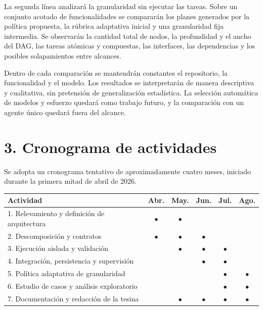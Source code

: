 \documentclass[11pt,a4paper]{article}
\begin{document}
La segunda l\'inea analizar\'a la granularidad sin ejecutar las tareas. Sobre un
conjunto acotado de funcionalidades se comparar\'an los planes generados por la
pol\'itica propuesta, la r\'ubrica adaptativa inicial y una granularidad fija
intermedia. Se observar\'an la cantidad total de nodos, la profundidad y el ancho
del DAG, las tareas at\'omicas y compuestas, las interfaces, las dependencias y
los posibles solapamientos entre alcances.

Dentro de cada comparaci\'on se mantendr\'an constantes el repositorio, la
funcionalidad y el modelo. Los resultados se interpretar\'an de manera
descriptiva y cualitativa, sin pretensi\'on de generalizaci\'on estad\'istica. La
selecci\'on autom\'atica de modelos y esfuerzo quedar\'a como trabajo futuro, y la
comparaci\'on con un agente \'unico quedar\'a fuera del alcance.

\section*{3. Cronograma de actividades}

Se adopta un cronograma tentativo de aproximadamente cuatro meses, iniciado
durante la primera mitad de abril de 2026.

\begin{center}
\small
\begin{tabularx}{\textwidth}{@{}Xccccc@{}}
  \toprule
  \textbf{Actividad} & \textbf{Abr.} & \textbf{May.} & \textbf{Jun.} & \textbf{Jul.} & \textbf{Ago.} \\
  \midrule
  1. Relevamiento y definici\'on de arquitectura
    & \(\bullet\) & \(\bullet\) & & & \\
  2. Descomposici\'on y contratos
    & \(\bullet\) & \(\bullet\) & \(\bullet\) & & \\
  3. Ejecuci\'on aislada y validaci\'on
    & & \(\bullet\) & \(\bullet\) & \(\bullet\) & \\
  4. Integraci\'on, persistencia y supervisi\'on
    & & & \(\bullet\) & \(\bullet\) & \\
  5. Pol\'itica adaptativa de granularidad
    & & & & \(\bullet\) & \(\bullet\) \\
  6. Estudio de casos y an\'alisis exploratorio
    & & & & \(\bullet\) & \(\bullet\) \\
  7. Documentaci\'on y redacci\'on de la tesina
    & & \(\bullet\) & \(\bullet\) & \(\bullet\) & \(\bullet\) \\
  \bottomrule
\end{tabularx}
\end{center}
\end{document}
